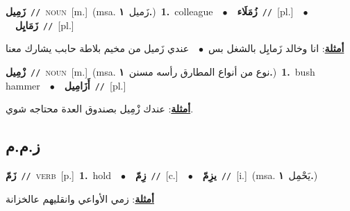 \documentclass[10pt,a4paper,twoside]{article} %
\begin{document}
\begin{multicols}{2}
{\setlength\topsep{0pt}\textbf{\foreignlanguage{arabic}{زَمِيل}}\ {\color{gray}\texttt{//}\color{black}}\ \textsc{noun}\ [m.]\ \color{gray}(msa. \foreignlanguage{arabic}{زَميل}~\foreignlanguage{arabic}{\textbf{١.}})\color{black}\ \textbf{1.}~colleague\ \ $\bullet$\ \ \setlength\topsep{0pt}\textbf{\foreignlanguage{arabic}{زُمَلَاء}}\ {\color{gray}\texttt{//}\color{black}}\ [pl.]\ \ $\bullet$\ \ \setlength\topsep{0pt}\textbf{\foreignlanguage{arabic}{زَمَايِل}}\ {\color{gray}\texttt{//}\color{black}}\ [pl.]\  \begin{flushright}\color{gray}\foreignlanguage{arabic}{\textbf{\underline{\foreignlanguage{arabic}{أمثلة}}}: انا وخالد زَمايِل بالشغل بس\ $\bullet$\ \  عندي زَميل من مخيم بلاطة حابب يشارك معنا}\end{flushright}\color{black}} \vspace{2mm}

{\setlength\topsep{0pt}\textbf{\foreignlanguage{arabic}{زْمِيل}}\ {\color{gray}\texttt{//}\color{black}}\ \textsc{noun}\ [m.]\ \color{gray}(msa. \foreignlanguage{arabic}{نوع من أنواع المطارق رأسه مسنن}~\foreignlanguage{arabic}{\textbf{١.}})\color{black}\ \textbf{1.}~bush hammer\ \ $\bullet$\ \ \setlength\topsep{0pt}\textbf{\foreignlanguage{arabic}{أَزَامِيل}}\ {\color{gray}\texttt{//}\color{black}}\ [pl.]\  \begin{flushright}\color{gray}\foreignlanguage{arabic}{\textbf{\underline{\foreignlanguage{arabic}{أمثلة}}}: عندك زْمِيل بصندوق العدة محتاجه شوي.}\end{flushright}\color{black}} \vspace{2mm}

\vspace{-3mm}
\subsection*{\color{blue}\foreignlanguage{arabic}{ز.م.م}\color{blue}{}} 

{\setlength\topsep{0pt}\textbf{\foreignlanguage{arabic}{زَمّ}}\ {\color{gray}\texttt{//}\color{black}}\ \textsc{verb}\ [p.]\ \textbf{1.}~hold\ \ $\bullet$\ \ \setlength\topsep{0pt}\textbf{\foreignlanguage{arabic}{زِمّ}}\ {\color{gray}\texttt{//}\color{black}}\ [c.]\ \ $\bullet$\ \ \setlength\topsep{0pt}\textbf{\foreignlanguage{arabic}{يزِمّ}}\ {\color{gray}\texttt{//}\color{black}}\ [i.]\ \color{gray}(msa. \foreignlanguage{arabic}{يَحْمِل}~\foreignlanguage{arabic}{\textbf{١.}})\color{black}\  \begin{flushright}\color{gray}\foreignlanguage{arabic}{\textbf{\underline{\foreignlanguage{arabic}{أمثلة}}}: زمي الأواعي وانقليهم عالخزانة}\end{flushright}\color{black}} \vspace{2mm}


\end{multicols}
\end{document}
